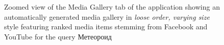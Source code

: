 \documentclass{sig-alt-release2}
\begin{document}
\begin{figure}[t!]
  \centering
  \setlength{\fboxsep}{1pt}
  \caption{Zoomed view of the Media Gallery tab of the application
    showing an automatically generated media gallery in \emph{loose order, varying size} style
    featuring ranked media items stemming from Facebook and YouTube for the query
    \selectfont Метеороид \selectfont}
  \label{fig:media-gallery}
\end{figure}



\end{document}

